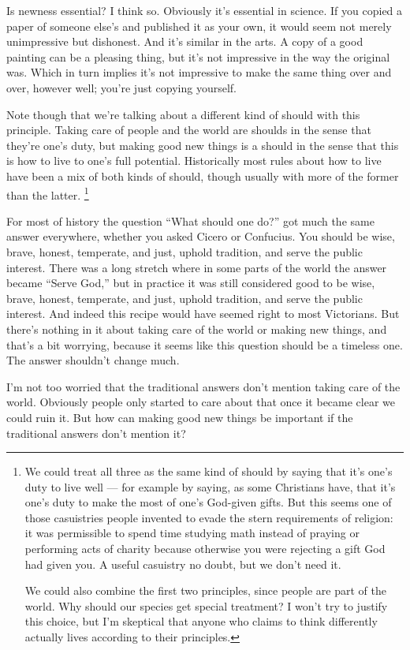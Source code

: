 Is newness essential? I think so. Obviously it's essential in science.
If you copied a paper of someone else's and published it as your own, it
would seem not merely unimpressive but dishonest. And it's similar in
the arts. A copy of a good painting can be a pleasing thing, but it's
not impressive in the way the original was. Which in turn implies it's
not impressive to make the same thing over and over, however well;
you're just copying yourself.

Note though that we're talking about a different kind of should with
this principle. Taking care of people and the world are shoulds in the
sense that they're one's duty, but making good new things is a should in
the sense that this is how to live to one's full potential. Historically
most rules about how to live have been a mix of both kinds of should,
though usually with more of the former than the latter.
\footnote{We could treat all three as the same kind of should by saying
that it's one's duty to live well --- for example by saying, as some
Christians have, that it's one's duty to make the most of one's
God-given gifts. But this seems one of those casuistries people invented
to evade the stern requirements of religion: it was permissible to spend
time studying math instead of praying or performing acts of charity
because otherwise you were rejecting a gift God had given you. A useful
casuistry no doubt, but we don't need it.

We could also combine the first two principles, since people are part of
the world. Why should our species get special treatment? I won't try to
justify this choice, but I'm skeptical that anyone who claims to think
differently actually lives according to their principles.}

For most of history the question ``What should one do?'' got much the
same answer everywhere, whether you asked Cicero or Confucius. You
should be wise, brave, honest, temperate, and just, uphold tradition,
and serve the public interest. There was a long stretch where in some
parts of the world the answer became ``Serve God,'' but in practice it
was still considered good to be wise, brave, honest, temperate, and
just, uphold tradition, and serve the public interest. And indeed this
recipe would have seemed right to most Victorians. But there's nothing
in it about taking care of the world or making new things, and that's a
bit worrying, because it seems like this question should be a timeless
one. The answer shouldn't change much.

I'm not too worried that the traditional answers don't mention taking
care of the world. Obviously people only started to care about that once
it became clear we could ruin it. But how can making good new things be
important if the traditional answers don't mention it?

